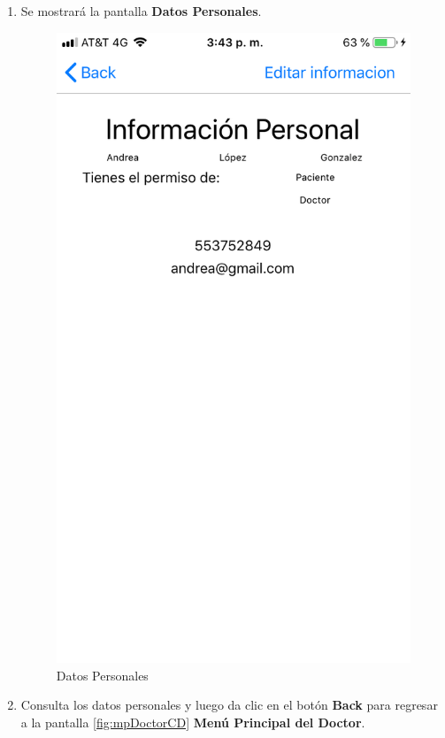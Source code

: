 \begin{enumerate}
	\item Se mostrará la pantalla \textbf{Datos Personales}. 
	\newpage
	\begin{figure}[!htbp]			
		\hypertarget{fig:DatosPersonales}{\hspace{1pt}}
		\begin{center}
			\includegraphics[height=0.4\textheight]{Doctor/ConsultarDP/images/DatosPersonales}
			\caption{Datos Personales}
			\label{fig:DatosPersonales}
		\end{center}
	\end{figure}

	\item Consulta los datos personales y luego da clic en el botón \textbf{Back} para regresar a la pantalla \ref{fig:mpDoctorCD} \textbf{Menú Principal del Doctor}.


\end{enumerate}

